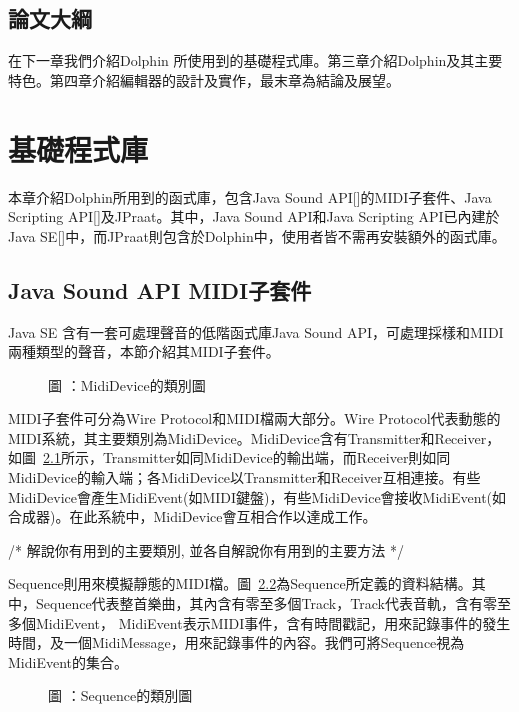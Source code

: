 \documentclass[12pt,a4paper,oneside]{report}
\begin{document}
\section{論文大綱}

在下一章我們介紹Dolphin 所使用到的基礎程式庫。第三章介紹Dolphin及其主要特色。第四章介紹編輯器的設計及實作，最末章為結論及展望。

\chapter{基礎程式庫}

本章介紹Dolphin所用到的函式庫，包含Java Sound API[]的MIDI子套件、Java Scripting API[]及JPraat。其中，Java Sound API和Java Scripting API已內建於Java SE[]中，而JPraat則包含於Dolphin中，使用者皆不需再安裝額外的函式庫。

\section{Java Sound API MIDI子套件}

Java SE 含有一套可處理聲音的低階函式庫Java Sound API，可處理採樣和MIDI兩種類型的聲音，本節介紹其MIDI子套件。

\begin{figure}
\caption{
 圖 \label{fig:mididevice}：MidiDevice的類別圖
}
\end{figure}

MIDI子套件可分為Wire Protocol和MIDI檔兩大部分。Wire Protocol代表動態的MIDI系統，其主要類別為MidiDevice。MidiDevice含有Transmitter和Receiver，如圖~\ref{fig:mididevice}所示，Transmitter如同MidiDevice的輸出端，而Receiver則如同MidiDevice的輸入端；各MidiDevice以Transmitter和Receiver互相連接。有些MidiDevice會產生MidiEvent(如MIDI鍵盤)，有些MidiDevice會接收MidiEvent(如合成器)。在此系統中，MidiDevice會互相合作以達成工作。

/*
     解說你有用到的主要類別, 並各自解說你有用到的主要方法
*/




Sequence則用來模擬靜態的MIDI檔。圖~\ref{fig:sequence}為Sequence所定義的資料結構。其中，Sequence代表整首樂曲，其內含有零至多個Track，Track代表音軌，含有零至多個MidiEvent， MidiEvent表示MIDI事件，含有時間戳記，用來記錄事件的發生時間，及一個MidiMessage，用來記錄事件的內容。我們可將Sequence視為MidiEvent的集合。

\begin{figure}
\caption{圖 \label{fig:sequence}：Sequence的類別圖}
\end{figure}
\end{document}
